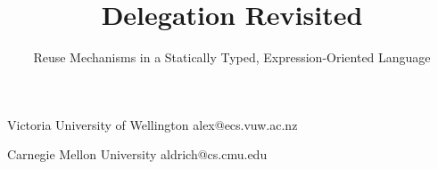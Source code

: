 \documentclass[preprint,10pt]{sigplanconf}
\begin{document}
\setlength{\pdfpageheight}{\paperheight}
\setlength{\pdfpagewidth}{\paperwidth}




\title{Delegation Revisited}
\subtitle{Reuse Mechanisms in a Statically Typed, Expression-Oriented Language}

           {Victoria University of Wellington}
           {alex@ecs.vuw.ac.nz}

           {Carnegie Mellon University}
           {aldrich@cs.cmu.edu}
		   		   
\maketitle



\end{document}
